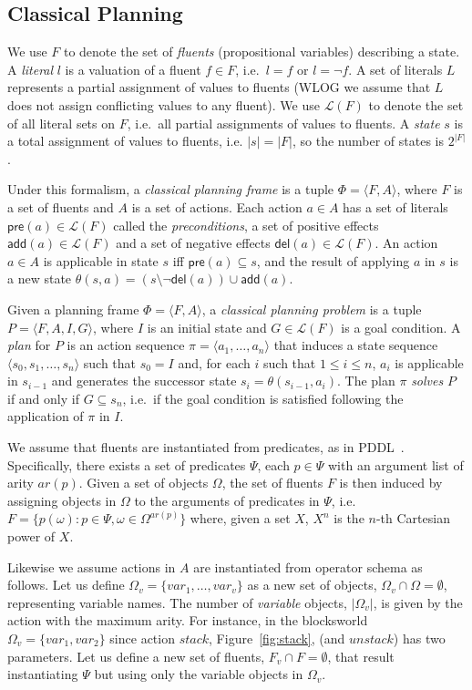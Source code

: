 \documentclass[letterpaper]{article} %
\newcommand{\tup}[1]{{\langle #1 \rangle}}
\newcommand{\pre}{\mathsf{pre}}     %
\newcommand{\del}{\mathsf{del}}     %
\newcommand{\add}{\mathsf{add}}     %
\begin{document}
\subsection{Classical Planning}
We use $F$ to denote the set of {\em fluents} (propositional variables) describing a state. A {\em literal} $l$ is a valuation of a fluent $f\in F$, i.e.~$l=f$ or $l=\neg f$. A set of literals $L$ represents a partial assignment of values to fluents (WLOG we assume that $L$ does not assign conflicting values to any fluent). We use $\mathcal{L}(F)$ to denote the set of all literal sets on $F$, i.e.~all partial assignments of values to fluents. A {\em state} $s$ is a total assignment of values to fluents, i.e. $|s|=|F|$, so the number of states is $2^{|F|}$. 

Under this formalism, a {\em classical planning frame} is a tuple $\Phi=\tup{F,A}$, where $F$ is a set of fluents and $A$ is a set of actions. Each action $a\in A$ has a set of literals $\pre(a)\in\mathcal{L}(F)$ called the {\em preconditions}, a set of positive effects $\add(a)\in\mathcal{L}(F)$ and a set of negative effects $\del(a)\in\mathcal{L}(F)$. An action $a\in A$ is applicable in state $s$ iff $\pre(a)\subseteq s$, and the result of applying $a$ in $s$ is a new state $\theta(s,a)=(s\setminus \neg\del(a))\cup\add(a)$.

Given a planning frame $\Phi=\tup{F,A}$, a {\em classical planning problem} is a tuple $P=\tup{F,A,I,G}$, where $I$ is an initial state and $G\in\mathcal{L}(F)$ is a goal condition. A {\em plan} for $P$ is an action sequence $\pi=\tup{a_1, \ldots, a_n}$ that induces a state sequence $\tup{s_0, s_1, \ldots, s_n}$ such that $s_0=I$ and, for each $i$ such that {\small $1\leq i\leq n$}, $a_i$ is applicable in $s_{i-1}$ and generates the successor state $s_i=\theta(s_{i-1},a_i)$. The plan $\pi$ {\em solves} $P$ if and only if $G\subseteq s_n$, i.e.~if the goal condition is satisfied following the application of $\pi$ in $I$.

We assume that fluents are instantiated from predicates, as in PDDL~\cite{fox2003pddl2}. Specifically, there exists a set of predicates $\Psi$, each $p\in\Psi$ with an argument list of arity $ar(p)$. Given a set of objects $\Omega$, the set of fluents $F$ is then induced by assigning objects in $\Omega$ to the arguments of predicates in $\Psi$, i.e.~$F=\{p(\omega):p\in\Psi,\omega\in\Omega^{ar(p)}\}$ where, given a set $X$, $X^n$ is the $n$-th Cartesian power of $X$.

Likewise we assume actions in $A$ are instantiated from operator schema as follows. Let us define $\Omega_v=\{var_1,\ldots,var_v\}$ as a new set of objects, $\Omega_v\cap\Omega=\emptyset$, representing variable names. The number of {\em variable} objects, $|\Omega_v|$, is given by the action with the maximum arity. For instance, in the blocksworld $\Omega_v=\{var_1,var_2\}$ since action $stack$, Figure~\ref{fig:stack}, (and $unstack$) has two parameters. Let us define a new set of fluents, $F_{v}\cap F=\emptyset$, that result instantiating $\Psi$ but using only the variable objects in $\Omega_v$.
\end{document}
